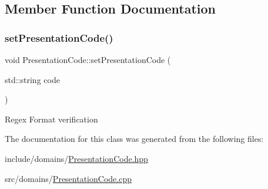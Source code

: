 \subsection{Member Function Documentation}
\mbox{\label{class_presentation_code_a85bfe04587ad392b60cef5bfe7057592}} 
\subsubsection{\texorpdfstring{setPresentationCode()}{setPresentationCode()}}
{\footnotesize\ttfamily void Presentation\+Code\+::set\+Presentation\+Code (\begin{DoxyParamCaption}\item[{std\+::string}]{code }\end{DoxyParamCaption})}

Regex Format verification 

The documentation for this class was generated from the following files\+:\begin{DoxyCompactItemize}
\item 
include/domains/\mbox{\hyperlink{_presentation_code_8hpp}{Presentation\+Code.\+hpp}}\item 
src/domains/\mbox{\hyperlink{_presentation_code_8cpp}{Presentation\+Code.\+cpp}}\end{DoxyCompactItemize}
